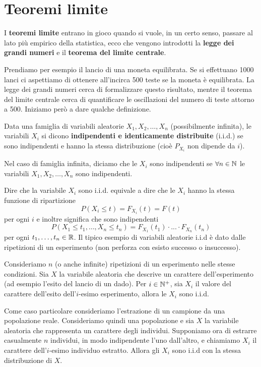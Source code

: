 \section{Teoremi limite}
I \textbf{teoremi limite} entrano in gioco quando si vuole, in un certo senso, passare al lato
più empirico della statistica, ecco che vengono introdotti la \textbf{legge dei grandi numeri} e
il \textbf{teorema del limite centrale}.

Prendiamo per esempio il lancio di una moneta equilibrata. Se si effettuano 1000 lanci ci
aspettiamo di ottenere all'incirca 500 teste se la moneta è equilibrata. La legge dei grandi numeri
cerca di formalizzare questo risultato, mentre il teorema del limite centrale cerca di quantificare
le oscillazioni del numero di teste attorno a 500. Iniziamo però a dare qualche definizione.

\begin{definition}
	Data una famiglia di variabili aleatorie $X_1, X_2, \dots, X_n$ (possibilmente infinita), le
	variabili $X_i$ si dicono \textbf{indipendenti e identicamente distribuite} (i.i.d.) se sono
	indipendenti e hanno la stessa distribuzione (cioè $P_{X_i}$ non dipende da $i$).
\end{definition}

Nel caso di famiglia infinita, diciamo che le $X_i$ sono indipendenti se $\forall n \in \mathbb{N}$ le
variabili $X_1, X_2, \dots, X_n$ sono indipendenti.

Dire che la variabile $X_i$ sono i.i.d. equivale a dire che le $X_i$ hanno la stessa funzione di
ripartizione
\[ P(X_i \leq t) = F_{X_i} (t) = F(t) \]
per ogni $i$ e inoltre significa che sono indipendenti
\[ P(X_1 \leq t_1, \dots, X_n \leq t_n) = F_{X_1} (t_1) \cdot ... \cdot F_{X_n} (t_n) \]
per ogni $t_1, \dots, t_n \in \mathbb{R}$. Il tipico esempio di variabili aleatorie i.i.d è dato dalle
ripetizioni di un esperimento (non perforza con esisto successo o insuccesso).

Consideriamo $n$ (o anche infinite) ripetizioni di un esperimento nelle stesse condizioni. Sia
$X$ la variabile aleatoria che descrive un carattere dell'esperimento (ad esempio l'esito del
lancio di un dado). Per $i \in \mathbb{N}^+$, sia $X_i$ il valore del carattere dell'esito dell'$i$-esimo
esperimento, allora le $X_i$ sono i.i.d.

Come caso particolare consideriamo l'estrazione di un campione da una popolazione reale.
Consideriamo quindi una popolazione e sia $X$ la variabile aleatoria che rappresenta un carattere
degli individui. Supponiamo ora di estrarre casualmente $n$ individui, in modo indipendente l'uno
dall'altro, e chiamiamo $X_i$ il carattere dell'$i$-esimo individuo estratto. Allora gli $X_i$
sono i.i.d con la stessa distribuzione di $X$.

